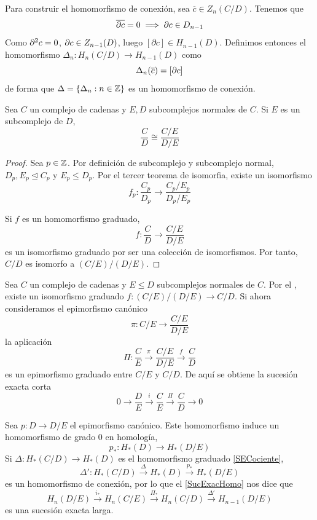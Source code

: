 Para construir el homomorfismo de conexión, sea $\overline c \in Z_n(C/D)$.
Tenemos que
\[\overline{\partial c}=0 \implies \partial c \in D_{n-1}\]
Como $\partial^2c=0$, $\partial c \in Z_{n-1}(D)$, luego $[\partial c] \in H_{n-1}(D)$.
Definimos entonces el homomorfismo $\Delta_n\colon H_n(C/D) \to H_{n-1}(D)$
como
\[\Delta_n(\overline c)=[\partial c]\]
de forma que $\Delta=\{\Delta_n: n \in \mathbb{Z}\}$ es un homomorfismo de
conexión.

\begin{lemma}
Sea $C$ un complejo de cadenas y $E,D$ subcomplejos normales de $C$. Si $E$
es un subcomplejo de $D$,
\[\frac{C}{D} \cong \frac{C/E}{D/E}\]
\end{lemma}


\begin{proof}
Sea $p \in \mathbb{Z}$. Por definición de subcomplejo y subcomplejo normal,
$D_p,E_p \trianglelefteq C_p$ y $E_p \leq D_p$. Por el tercer teorema de
isomorfia, existe un isomorfismo
\[f_p\colon \frac{C_p}{D_p} \longrightarrow \frac{C_p/E_p}{D_p/E_p}\]

Si $f$ es un homomorfismo graduado,
\[f\colon \frac{C}{D} \longrightarrow \frac{C/E}{D/E}\]
es un isomorfismo graduado por ser una colección de isomorfismos. Por tanto,
$C/D$ es isomorfo a $(C/E)/(D/E)$.
\end{proof}

Sea $C$ un complejo de cadenas y $E \leq D$ subcomplejos normales de $C$. Por
el , existe un isomorfismo graduado $f\colon (C/E)/(D/E)
\to C/D$. Si ahora consideramos el epimorfismo canónico
\[\pi\colon C/E\longrightarrow \frac{C/E}{D/E}\]
la aplicación
\[\Pi\colon \frac{C}{E} \xrightarrow{\pi} \frac{C/E}{D/E} \xrightarrow{f}
\frac{C}{D}\]
es un epimorfismo graduado entre $C/E$ y $C/D$. De aquí se
obtiene la sucesión exacta corta
\[0 \longrightarrow \frac{D}{E} \xrightarrow{i} \frac{C}{E}
\xrightarrow{\Pi}\frac{C}{D} \longrightarrow 0\]

Sea $p\colon D \to D/E$ el epimorfismo canónico. Este homomorfismo induce un
homomorfismo de grado 0 en homología,
\[p_*\colon H_*(D) \longrightarrow H_*(D/E)\]
Si $\Delta\colon H_*(C/D) \to H_*(D)$ es el homomorfismo graduado
\eqref{SECociente},
\begin{equation}
\label{DeltaCPrima}
\Delta'\colon H_*(C/D) \xrightarrow{\Delta} H_*(D) \xrightarrow{p_*} H_*(D/E)
\end{equation}
es un homomorfismo de conexión, por lo que el \eqref{SucExacHomo} nos dice
que
\begin{equation}
\label{SECociente2}
H_n(D/E) \xrightarrow{i_*} H_n(C/E) \xrightarrow{\Pi_*} H_n(C/D)
\xrightarrow{\Delta'} H_{n-1}(D/E)
\end{equation}
es una sucesión exacta larga.

